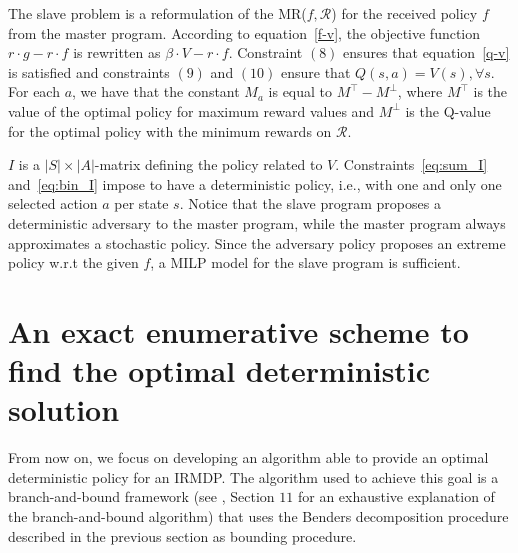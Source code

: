 \documentclass[sigconf]{aamas}  %
\begin{document}
The slave problem is a reformulation of the MR($f, \mathcal{R}$) for the received policy $f$ from the master program. According to equation~\eqref{f-v}, the objective function $r \cdot g - r \cdot f$ is rewritten as $\beta \cdot V - r \cdot f$. 
% 
Constraint $(8)$ ensures that equation~\eqref{q-v} is satisfied and 
%
constraints $(9)$ and $(10)$ ensure that $Q(s, a) = V(s), \forall s $.
For each $a$, we have that the constant $M_a$ is equal to  $M^{\top} - M^{\perp}$, where  $M^{\top}$ is the value of the optimal policy for maximum reward values 
and $M^{\perp}$ is the Q-value for the optimal policy with the minimum rewards on $\mathcal{R}$. 

$I$ is a $|S|\times|A|$-matrix defining the policy related to $V$. 
Constraints~\eqref{eq:sum_I} and~\eqref{eq:bin_I} impose to  have a deterministic policy, i.e., with one and only one selected action $a$ per state $s$. Notice that the slave program proposes a deterministic adversary to the master program, while the master program always approximates a stochastic policy. Since the adversary policy proposes an extreme policy w.r.t the given $f$, a MILP model for the slave program is sufficient.   


\section{An exact enumerative scheme to find the optimal deterministic solution}\label{sec:bb} 

From now on, we focus on developing an algorithm able to provide an optimal deterministic policy for an IRMDP.
The algorithm used to achieve this goal is a branch-and-bound framework (see \cite{bertsimas2005optimization}, Section $11$ for an exhaustive explanation of the branch-and-bound algorithm) that uses the Benders decomposition procedure described in the previous section as bounding procedure. 
\end{document}
